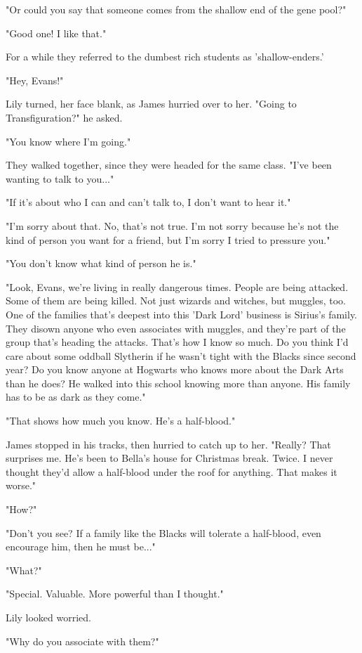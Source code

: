 \documentclass[a4paper,11pt]{article}
\begin{document}
"Or could you say that someone comes from the shallow end of the gene pool?"

"Good one! I like that."

For a while they referred to the dumbest rich students as 'shallow-enders.'

"Hey, Evans!"

Lily turned, her face blank, as James hurried over to her. "Going to Transfiguration?" he asked.

"You know where I'm going."

They walked together, since they were headed for the same class. "I've been wanting to talk to you..."

"If it's about who I can and can't talk to, I don't want to hear it."

"I'm sorry about that. No, that's not true. I'm not sorry because he's not the kind of person you want for a friend, but I'm sorry I tried to pressure you."

"You don't know what kind of person he is."

"Look, Evans, we're living in really dangerous times. People are being attacked. Some of them are being killed. Not just wizards and witches, but muggles, too. One of the families that's deepest into this 'Dark Lord' business is Sirius's family. They disown anyone who even associates with muggles, and they're part of the group that's heading the attacks. That's how I know so much. Do you think I'd care about some oddball Slytherin if he wasn't tight with the Blacks since second year? Do you know anyone at Hogwarts who knows more about the Dark Arts than he does? He walked into this school knowing more than anyone. His family has to be as dark as they come."

"That shows how much you know. He's a half-blood."

James stopped in his tracks, then hurried to catch up to her. "Really? That surprises me. He's been to Bella's house for Christmas break. Twice. I never thought they'd allow a half-blood under the roof for anything. That makes it worse."

"How?"

"Don't you see? If a family like the Blacks will tolerate a half-blood, even encourage him, then he must be..."

"What?"

"Special. Valuable. More powerful than I thought."

Lily looked worried.

"Why do you associate with them?"
\end{document}
